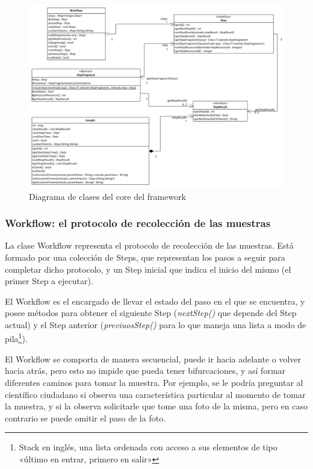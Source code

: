 \begin{figure}[H]
  \centering
    \includegraphics[scale=0.4]{05-implementacion/FrameworkCore.png} 
   \caption{Diagrama de clases del core del framework}
   \label{fig:umlFrameworkCore}
\end{figure}


\subsubsection{Workflow: el protocolo de recolección de las muestras}
La clase Workflow representa el protocolo de recolección de las muestras. Está formado por una colección de Steps, que representan los pasos a seguir para completar dicho protocolo, y un Step inicial que indica el inicio del mismo (el primer Step a ejecutar).

El Workflow es el encargado de llevar el estado del paso en el que se encuentra, y posee métodos para obtener el siguiente Step (\textit{nextStep()}  que depende del Step actual) y el Step anterior (\textit{previuosStep()}  para lo que maneja una lista a modo de pila\footnote{Stack en inglés, una lista ordenada con acceso a sus elementos de tipo «último en entrar, primero en salir»}).

El Workflow se comporta de manera secuencial, puede ir hacia adelante o volver hacia atrás, pero esto no impide que pueda tener bifurcaciones, y así formar diferentes caminos para tomar la muestra. Por ejemplo, se le podría preguntar al científico ciudadano si observa una característica particular al momento de tomar la muestra, y si la observa solicitarle que tome una foto de la misma, pero en caso contrario se puede omitir el paso de la foto.


